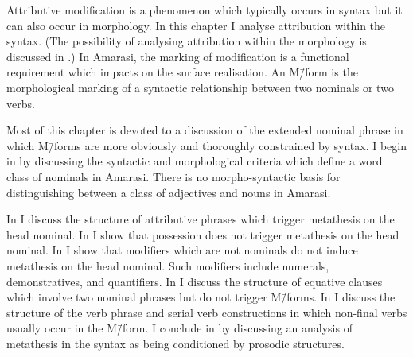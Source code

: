 Attributive modification is a phenomenon which typically
occurs in syntax but it can also occur in morphology.
In this chapter I analyse attribution within the syntax.
(The possibility of analysing attribution within the morphology is discussed in .)
In Amarasi, the marking of modification is a functional requirement
which impacts on the surface realisation.
An M\=/form is the morphological marking of
a syntactic relationship between two nominals or two verbs.

\begin{multicols}{2}
	\begin{exe}
		\label{tr:ExtNom}
		\label{tr:VerPhr}
	\end{exe}
\end{multicols}

Most of this chapter is devoted to a discussion of the extended
nominal phrase in which M\=/forms are more obviously and thoroughly constrained by syntax.
I begin in  by discussing the
syntactic and morphological criteria which
define a word class of nominals in Amarasi.
There is no morpho-syntactic basis for distinguishing
between a class of adjectives and nouns in Amarasi.

In  I discuss the structure of attributive phrases
which trigger metathesis on the head nominal.
In  I show that possession
does not trigger metathesis on the head nominal.
In  I show that modifiers which are not nominals
do not induce metathesis on the head nominal.
Such modifiers include numerals, demonstratives, and quantifiers.
In  I discuss the structure
of equative clauses which involve two nominal phrases but do not trigger M\=/forms.
In  I discuss the structure
of the verb phrase and serial verb constructions
in which non-final verbs usually occur in the M\=/form.
I conclude in  by discussing an analysis
of metathesis in the syntax as being conditioned by prosodic structures.